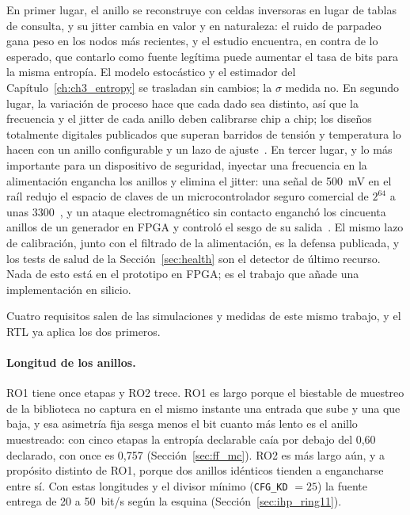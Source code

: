 En primer lugar, el anillo se reconstruye con celdas inversoras en lugar de
tablas de consulta, y su jitter cambia en valor y en naturaleza: el ruido
de parpadeo gana peso en los nodos más recientes, y el estudio encuentra, en
contra de lo esperado, que contarlo como fuente legítima puede aumentar el
tasa de bits para la misma entropía. El modelo estocástico y el estimador del
Capítulo~\ref{ch:ch3_entropy} se trasladan sin cambios; la $\sigma$ medida
no. En segundo lugar, la variación de proceso hace que cada dado sea
distinto, así que la frecuencia y el jitter de cada anillo deben calibrarse
chip a chip; los diseños totalmente digitales publicados que superan
barridos de tensión y temperatura lo hacen con un anillo configurable y un
lazo de ajuste~\cite{yang_2016_jssc}. En tercer lugar, y lo más importante
para un dispositivo de seguridad, inyectar una frecuencia en la alimentación
engancha los anillos y elimina el jitter: una señal de 500~mV en el raíl
redujo el espacio de claves de un microcontrolador seguro comercial de
$2^{64}$ a unas 3300~\cite{markettos_2009_frequency}, y un ataque
electromagnético sin contacto enganchó los cincuenta anillos de un generador
en \ac{FPGA} y controló el sesgo de su
salida~\cite{bayon_2012_contactless}. El mismo lazo de
calibración, junto con el filtrado de la alimentación, es la defensa
publicada, y los tests de salud de la Sección~\ref{sec:health} son el
detector de último recurso. Nada de esto está en el prototipo en FPGA; es el
trabajo que añade una implementación en silicio.

Cuatro requisitos salen de las simulaciones y medidas de este mismo
trabajo, y el \ac{RTL} ya aplica los dos primeros.

\paragraph{Longitud de los anillos.} RO1 tiene once etapas y RO2 trece.
RO1 es largo porque el biestable de muestreo de la biblioteca no captura
en el mismo instante una entrada que sube y una que baja, y esa
asimetría fija sesga menos el bit cuanto más lento es el anillo
muestreado: con cinco etapas la entropía declarable caía por debajo del
0,60 declarado, con once es 0,757 \simu{} (Sección~\ref{sec:ff_mc}). RO2
es más largo aún, y a propósito distinto de RO1, porque dos anillos
idénticos tienden a engancharse entre sí. Con estas longitudes y el
divisor mínimo  (\texttt{CFG\_KD} $= 25$) la fuente entrega de 20
a 50~bit/s según la esquina \est{} (Sección~\ref{sec:ihp_ring11}).

